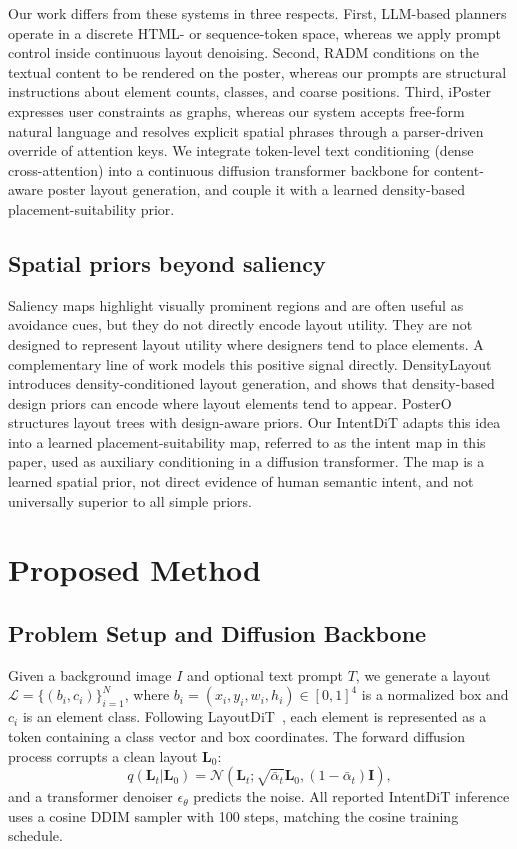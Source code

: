 \documentclass[review]{elsarticle}
\begin{document}
Our work differs from these systems in three respects. First, LLM-based planners operate in a discrete HTML- or sequence-token space, whereas we apply prompt control inside continuous layout denoising. Second, RADM conditions on the textual content to be rendered on the poster, whereas our prompts are structural instructions about element counts, classes, and coarse positions. Third, iPoster expresses user constraints as graphs, whereas our system accepts free-form natural language and resolves explicit spatial phrases through a parser-driven override of attention keys. We integrate token-level text conditioning (dense cross-attention) into a continuous diffusion transformer backbone for content-aware poster layout generation, and couple it with a learned density-based placement-suitability prior.

\subsection{Spatial priors beyond saliency}
Saliency maps highlight visually prominent regions and are often useful as avoidance cues, but they do not directly encode layout utility. They are not designed to represent layout utility where designers tend to place elements.
A complementary line of work models this positive signal directly. DensityLayout~\cite{Hsu23b} introduces density-conditioned layout generation, and shows that density-based design priors can encode where layout elements tend to appear. PosterO~\cite{Hsu25} structures layout trees with design-aware priors. Our IntentDiT adapts this idea into a learned placement-suitability map, referred to as the intent map in this paper, used as auxiliary conditioning in a diffusion transformer. The map is a learned spatial prior, not direct evidence of human semantic intent, and not universally superior to all simple priors.

\section{Proposed Method}
\label{sec:method}

\subsection{Problem Setup and Diffusion Backbone}
\label{sec:problem}

Given a background image $I$ and optional text prompt $T$, we generate a layout
$\mathcal{L}=\{(b_i,c_i)\}_{i=1}^{N}$, where $b_i=(x_i,y_i,w_i,h_i)\in[0,1]^4$ is a normalized box and $c_i$ is an element class.
Following LayoutDiT~\cite{Li24}, each element is represented as a token containing a class vector and box coordinates.
The forward diffusion process corrupts a clean layout $\mathbf{L}_0$:
\begin{equation}
q(\mathbf{L}_t|\mathbf{L}_0)=
\mathcal{N}(\mathbf{L}_t;\sqrt{\bar{\alpha}_t}\mathbf{L}_0,(1-\bar{\alpha}_t)\mathbf{I}),
\end{equation}
and a transformer denoiser $\epsilon_\theta$ predicts the noise.
All reported IntentDiT inference uses a cosine DDIM sampler with 100 steps, matching the cosine training schedule.
\end{document}
